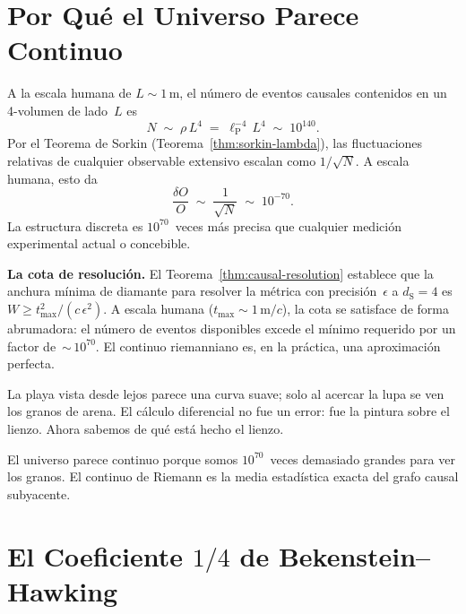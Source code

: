 \documentclass[11pt, a4paper, openany]{book}
\newcommand{\lP}{\ell_{\mathrm{P}}}
\newcommand{\dS}{d_{\mathrm{S}}}
\begin{document}
\section{Por Qu\'e el Universo Parece Continuo}
\label{sec:why-continuous}

A la escala humana de $L \sim 1\,\text{m}$, el n\'umero de eventos
causales contenidos en un 4-volumen de lado~$L$ es
\begin{equation}
  N \;\sim\; \rho\,L^4
  \;=\; \lP^{-4}\,L^4
  \;\sim\; 10^{140}.
  \label{eq:events-human-scale}
\end{equation}
Por el Teorema de Sorkin (Teorema~\ref{thm:sorkin-lambda}), las
fluctuaciones relativas de cualquier observable extensivo escalan como
$1/\sqrt{N}$.  A escala humana, esto da
\[
  \frac{\delta O}{O} \;\sim\; \frac{1}{\sqrt{N}}
  \;\sim\; 10^{-70}.
\]
La estructura discreta es $10^{70}$~veces m\'as precisa que cualquier
medici\'on experimental actual o concebible.

\medskip\noindent\textbf{La cota de resoluci\'on.}\quad
El Teorema~\ref{thm:causal-resolution} establece que la anchura m\'inima
de diamante para resolver la m\'etrica con precisi\'on~$\epsilon$ a
$\dS = 4$ es $W \geq t_{\max}^2/(c\,\epsilon^2)$.  A escala humana
($t_{\max} \sim 1\,\text{m}/c$), la cota se satisface de forma
abrumadora: el n\'umero de eventos disponibles excede el m\'inimo
requerido por un factor de~${\sim}\,10^{70}$.  El continuo riemanniano
es, en la pr\'actica, una aproximaci\'on perfecta.

\medskip\noindent
La playa vista desde lejos parece una curva suave; solo al acercar la
lupa se ven los granos de arena.  El c\'alculo diferencial no fue un
error: fue la pintura sobre el lienzo.  Ahora sabemos de qu\'e est\'a
hecho el lienzo.

\begin{result}[title={La Inaparencia de la Discretitud}]
El universo parece continuo porque somos $10^{70}$~veces demasiado
grandes para ver los granos.  El continuo de Riemann es la media
estad\'istica exacta del grafo causal subyacente.
\end{result}

\section{El Coeficiente $1/4$ de Bekenstein--Hawking}
\label{sec:bekenstein-hawking}
\end{document}
